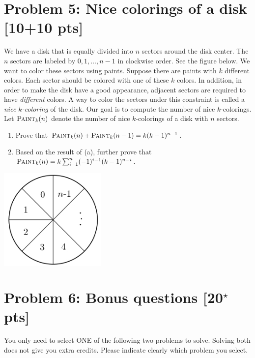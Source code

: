 \documentclass[11pt,twoside]{article}
\newcommand{\problem}[1]{\section*{Problem #1}}
\begin{document}
\problem{5: Nice colorings of a disk [10+10 pts]} 
We have a disk that is equally divided into $n$ sectors around the disk center.
The $n$ sectors are labeled by $0,1,\dots,n-1$ in clockwise order.
See the figure below.
We want to color these sectors using paints.
Suppose there are paints with $k$ different colors.
Each sector should be colored with one of these $k$ colors.
In addition, in order to make the disk have a good appearance, adjacent sectors are required to have \textit{different} colors.
A way to color the sectors under this constraint is called a \textit{nice $k$-coloring} of the disk.
Our goal is to compute the number of nice $k$-colorings.
Let $\textsc{Paint}_k(n)$ denote the number of nice $k$-colorings of a disk with $n$ sectors.
\begin{enumerate}
    \item Prove that $\textsc{Paint}_k(n) + \textsc{Paint}_k(n-1) = k(k-1)^{n-1}$.
    \item Based on the result of (a), further prove that $\textsc{Paint}_k(n) = k \sum_{i=1}^{n} (-1)^{i-1} (k-1)^{n-i}$.
\end{enumerate}

\begin{center}
    \includegraphics[height=5cm]{hw-fig-sector.jpg}
\end{center}

\problem{6: Bonus questions [20$^\star$ pts]}

{\color{red} You only need to select ONE of the following two problems to solve.
Solving both does not give you extra credits.
Please indicate clearly which problem you select.}
\end{document}
